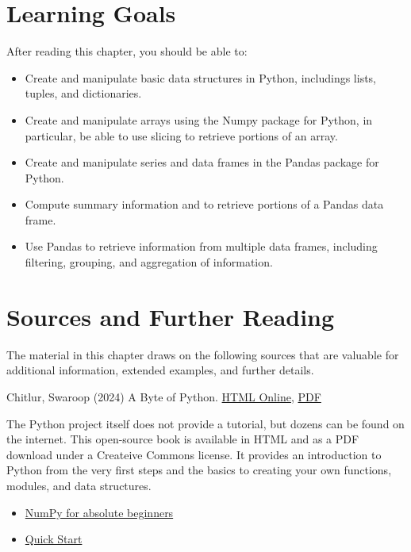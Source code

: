 %
%
\section*{Learning Goals}

After reading this chapter, you should be able to:
\begin{itemize}
   \item Create and manipulate basic data structures in Python, includings lists, tuples, and dictionaries.
   \item Create and manipulate arrays using the Numpy package for Python, in particular, be able to use slicing to retrieve portions of an array.
   \item Create and manipulate series and data frames in the Pandas package for Python.
   \item Compute summary information and to retrieve portions of a Pandas data frame.
   \item Use Pandas to retrieve information from multiple data frames, including filtering, grouping, and aggregation of information.
\end{itemize}

\section*{Sources and Further Reading}

The material in this chapter draws on the following sources that are valuable for additional information, extended examples, and further details.

\begin{tcolorbox}[colback=alert]
Chitlur, Swaroop (2024) A Byte of Python. \href{https://python.swaroopch.com/}{HTML Online}, \href{https://github.com/swaroopch/byte-of-python/releases/}{PDF} \\
\end{tcolorbox}

The Python project itself does not provide a tutorial, but dozens can be found on the internet. This open-source book is available in HTML and as a PDF download under a Createive Commons license. It provides an introduction to Python from the very first steps and the basics to creating your own functions, modules, and data structures. 

\begin{tcolorbox}[colback=alert]
\begin{itemize}
\item \href{https://numpy.org/doc/stable/user/absolute_beginners.html}{NumPy for absolute beginners}
\item \href{https://numpy.org/doc/stable/user/quickstart.html}{Quick Start}
\end{itemize}
\end{tcolorbox}

